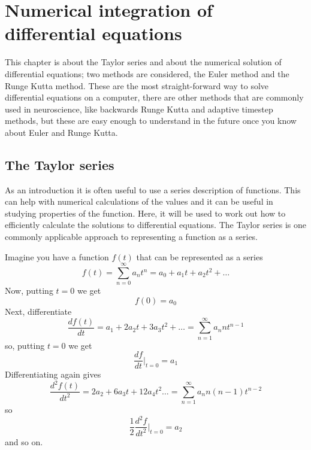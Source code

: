 \documentclass[12pt]{article}
\begin{document}
\section*{Numerical integration of differential equations} 

This chapter is about the Taylor series and about the numerical
solution of differential equations; two methods are considered, the
Euler method and the Runge Kutta method. These are the most
straight-forward way to solve differential equations on a computer,
there are other methods that are commonly used in neuroscience, like
backwards Runge Kutta and adaptive timestep methods, but these are
easy enough to understand in the future once you know about Euler and
Runge Kutta.

\subsection*{The Taylor series}

As an introduction it is often useful to use a series description of
functions. This can help with numerical calculations of the values and
it can be useful in studying properties of the function. Here, it will
be used to work out how to efficiently calculate the solutions to
differential equations. The Taylor series is one commonly applicable
approach to representing a function as a series.

Imagine you have a function $f(t)$ that can be represented as a series
\begin{equation}
f(t)=\sum_{n=0}^\infty{a_nt^n}=a_0+a_1t+a_2t^2+\ldots
\end{equation}
Now, putting $t=0$ we get
\begin{equation}
f(0)=a_0
\end{equation}
Next, differentiate
\begin{equation}
\frac{df(t)}{dt}=a_1+2a_2t+3a_3t^2+\ldots=\sum_{n=1}^\infty{a_nnt^{n-1}}
\end{equation}
so, putting $t=0$ we get
\begin{equation}
\frac{df}{dt}|_{t=0}=a_1
\end{equation}
Differentiating again gives
\begin{equation}
\frac{d^2f(t)}{dt^2}=2a_2+6a_3t+12a_4t^2\ldots=\sum_{n=1}^\infty{a_nn(n-1)t^{n-2}}
\end{equation}
so
\begin{equation}
\frac{1}{2}\frac{d^2f}{dt^2}|_{t=0}=a_2
\end{equation}
and so on.
\end{document}
